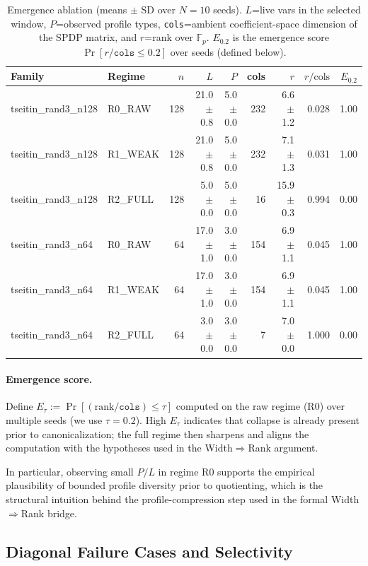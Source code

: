 \documentclass[12pt]{article}
\theoremstyle{definition}
\theoremstyle{definition}
\theoremstyle{remark}
\theoremstyle{remark}
\begin{document}
\begin{table}[t]\centering
\caption{Emergence ablation (means $\pm$ SD over $N{=}10$ seeds). $L$=live vars in the selected window, $P$=observed profile types, \texttt{cols}=ambient coefficient-space dimension of the SPDP matrix, and $r$=rank over $\mathbb{F}_p$. $E_{0.2}$ is the emergence score $\Pr[r/\texttt{cols} \le 0.2]$ over seeds (defined below).}
\label{tab:emergence-ablation}
\begin{tabular}{llrrrrrrr}
\toprule
Family & Regime & $n$ & $L$ & $P$ & cols & $r$ & $r/\mathrm{cols}$ & $E_{0.2}$ \\
\midrule
tseitin\_rand3\_n128 & R0\_RAW  & 128 & 21.0$\pm$0.8 & 5.0$\pm$0.0 & 232 & 6.6$\pm$1.2  & 0.028 & 1.00 \\
tseitin\_rand3\_n128 & R1\_WEAK & 128 & 21.0$\pm$0.8 & 5.0$\pm$0.0 & 232 & 7.1$\pm$1.3  & 0.031 & 1.00 \\
tseitin\_rand3\_n128 & R2\_FULL & 128 & 5.0$\pm$0.0  & 5.0$\pm$0.0 & 16  & 15.9$\pm$0.3 & 0.994 & 0.00 \\
tseitin\_rand3\_n64  & R0\_RAW  & 64  & 17.0$\pm$1.0 & 3.0$\pm$0.0 & 154 & 6.9$\pm$1.1  & 0.045 & 1.00 \\
tseitin\_rand3\_n64  & R1\_WEAK & 64  & 17.0$\pm$1.0 & 3.0$\pm$0.0 & 154 & 6.9$\pm$1.1  & 0.045 & 1.00 \\
tseitin\_rand3\_n64  & R2\_FULL & 64  & 3.0$\pm$0.0  & 3.0$\pm$0.0 & 7   & 7.0$\pm$0.0  & 1.000 & 0.00 \\
\bottomrule
\end{tabular}
\end{table}

\paragraph{Emergence score.}
Define $E_\tau := \Pr[(\mathrm{rank}/\texttt{cols}) \le \tau]$ computed on
the raw regime (R0) over multiple seeds (we use $\tau=0.2$). High $E_\tau$
indicates that collapse is already present prior to canonicalization; the
full regime then sharpens and aligns the computation with the hypotheses
used in the Width$\Rightarrow$Rank argument.

In particular, observing small $P/L$ in regime R0 supports the empirical
plausibility of bounded profile diversity prior to quotienting, which is
the structural intuition behind the profile-compression step used in the
formal Width$\Rightarrow$Rank bridge.

\subsection{Diagonal Failure Cases and Selectivity}
\end{document}
